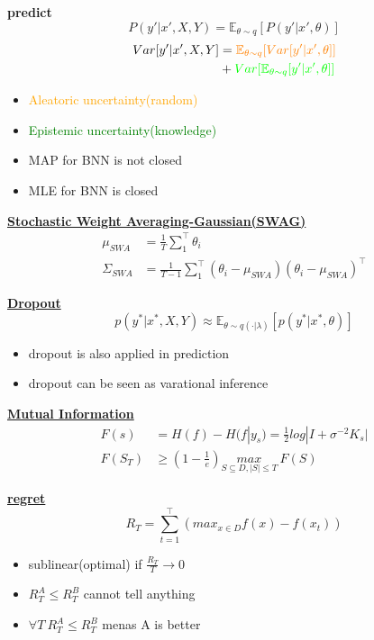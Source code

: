 \documentclass[landscape,a0paper,fontscale=0.285]{baposter} %
\newcommand{\compresslist}{ %
\setlength{\itemsep}{1pt}
\setlength{\parskip}{0pt}
\setlength{\parsep}{0pt}
}
\begin{document}
\begin{poster}
{\textbf{predict}
\vspace{-0.5cm}
$$
P(y'|x',X,Y) = \mathbb E_{\theta\sim q}[P(y'|x',\theta)]
$$
$$
\begin{aligned}
Var[y'|x',X,Y] &= {\color{orange}\mathbb E_{\theta\sim q}[Var[y'|x',\theta]]}\\
&+{\color{green}Var[\mathbb E_{\theta\sim q}[y'|x',\theta]]}
\end{aligned}
$$
\begin{itemize}\compresslist
    \item \textcolor{orange}{Aleatoric uncertainty(random)} 
    \item \textcolor{green}{Epistemic uncertainty(knowledge)}
\end{itemize}
\begin{itemize}\compresslist
    \item MAP for BNN is  not closed
    \item MLE for BNN is closed
\end{itemize}
\underline{\textbf{Stochastic Weight Averaging-Gaussian(SWAG)}}
\vspace{-0.2cm}
$$
\begin{aligned}
\mu_{SWA} &= \frac{1}{T}\sum_1^\top \theta_i\\
\Sigma_{SWA} &= \frac{1}{T-1}\sum_1^\top(\theta_i - \mu_{SWA})(\theta_i-\mu_{SWA})^\top
\end{aligned}
$$

\underline{\textbf{Dropout}}
\vspace{-0.3cm}
$$ 
p(y^*|x^*,X,Y) \approx \mathbb E_{\theta\sim q(\cdot|\lambda)}[p(y^*|x^*,\theta)]
$$
\begin{itemize}\compresslist
    \item dropout is also applied in prediction
    \item dropout can be seen as varational inference
\end{itemize}




\colorbox[HTML]{CCFFFF}{}
\underline{\textbf{Mutual Information}}
\vspace{-0.3cm}
$$
\begin{aligned}
F(s) &= H(f) - H(f|y_s) = \frac{1}{2}log|I+\sigma^{-2}K_s|
\\
F(S_T) &\ge (1-\frac{1}{e})\underset{S\subseteq D,|S|\le T}{max}~F(S)
\end{aligned}
$$

\underline{\textbf{regret}}
\vspace{-0.7cm}
$$
R_T = \sum_{t=1}^\top (max_{x\in D}f(x)-f(x_t))
$$
\begin{itemize}\compresslist
    \item sublinear(optimal) if $\frac{R_T}{T} \rightarrow 0$
    \item $R_T^A \le R_T^B$ cannot tell anything
    \item $\forall T~R_T^A \le R_T^B$ menas A is better
\end{itemize}


}
\end{poster}
\end{document}
